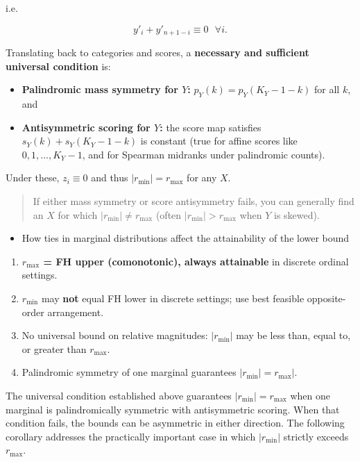 \documentclass[
  12pt,
]{article}
\providecommand{\tightlist}{%
  \setlength{\itemsep}{0pt}\setlength{\parskip}{0pt}}
\theoremstyle{plain}
\theoremstyle{definition}
\theoremstyle{remark}
\begin{document}
i.e.

\[y'_i + y'_{n+1-i}\equiv 0\ \ \ \forall i.\]

Translating back to categories and scores, a \textbf{necessary and
sufficient universal condition} is:

\begin{itemize}
\item
  \textbf{Palindromic mass symmetry for \(Y\):} \(p_Y(k)=p_Y(K_Y-1-k)\)
  for all \(k\), and
\item
  \textbf{Antisymmetric scoring for \(Y\):} the score map satisfies
  \(s_Y(k)+s_Y(K_Y-1-k)\) is constant (true for affine scores like
  \(0,1,\dots,K_Y-1\), and for Spearman midranks under palindromic
  counts).
\end{itemize}

Under these, \(z_i\equiv 0\) and thus \(|r_{\min}|=r_{\max}\) for any
\(X\).

\begin{quote}
If either mass symmetry or score antisymmetry fails, you can generally
find an \(X\) for which \(|r_{\min}|\ne r_{\max}\) (often
\(|r_{\min}|>r_{\max}\) when \(Y\) is skewed).
\end{quote}

\begin{itemize}
\tightlist
\item
  How ties in marginal distributions affect the attainability of the
  lower bound
\end{itemize}

\begin{enumerate}
\def\labelenumi{\arabic{enumi}.}
\tightlist
\item
  \textbf{\(r_{\max}\) = FH upper (comonotonic), always attainable} in
  discrete ordinal settings.
\item
  \textbf{\(r_{\min}\)} may \textbf{not} equal FH lower in discrete
  settings; use best feasible opposite-order arrangement.
\item
  No universal bound on relative magnitudes: \(|r_{\min}|\) may be less
  than, equal to, or greater than \(r_{\max}\).
\item
  Palindromic symmetry of one marginal guarantees
  \(|r_{\min}| = r_{\max}|\).
\end{enumerate}

The universal condition established above guarantees
\(|r_{\min}| = r_{\max}\) when one marginal is palindromically symmetric
with antisymmetric scoring. When that condition fails, the bounds can be
asymmetric in either direction. The following corollary addresses the
practically important case in which \(|r_{\min}|\) strictly exceeds
\(r_{\max}\).
\end{document}
